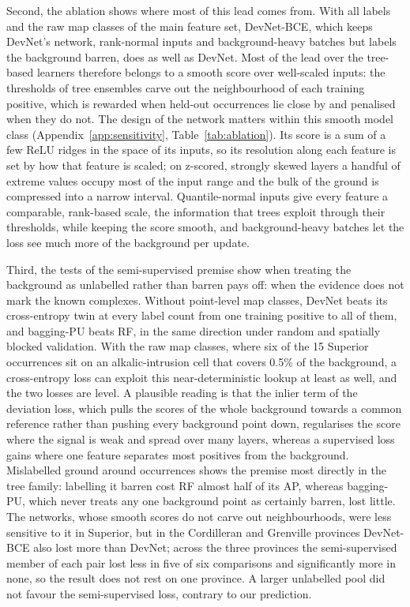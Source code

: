 \documentclass[pdflatex,sn-apa]{sn-jnl}
\begin{document}
Second, the ablation shows where most of this lead comes from. With all labels and the raw map classes of the main feature set, DevNet-BCE, which keeps DevNet's network, rank-normal inputs and background-heavy batches but labels the background barren, does as well as DevNet. Most of the lead over the tree-based learners therefore belongs to a smooth score over well-scaled inputs: the thresholds of tree ensembles carve out the neighbourhood of each training positive, which is rewarded when held-out occurrences lie close by and penalised when they do not. The design of the network matters within this smooth model class (Appendix~\ref{app:sensitivity}, Table~\ref{tab:ablation}). Its score is a sum of a few ReLU ridges in the space of its inputs, so its resolution along each feature is set by how that feature is scaled; on z-scored, strongly skewed layers a handful of extreme values occupy most of the input range and the bulk of the ground is compressed into a narrow interval. Quantile-normal inputs give every feature a comparable, rank-based scale, the information that trees exploit through their thresholds, while keeping the score smooth, and background-heavy batches let the loss see much more of the background per update.

Third, the tests of the semi-supervised premise show when treating the background as unlabelled rather than barren pays off: when the evidence does not mark the known complexes. Without point-level map classes, DevNet beats its cross-entropy twin at every label count from one training positive to all of them, and bagging-PU beats RF, in the same direction under random and spatially blocked validation. With the raw map classes, where six of the 15 Superior occurrences sit on an alkalic-intrusion cell that covers 0.5\% of the background, a cross-entropy loss can exploit this near-deterministic lookup at least as well, and the two losses are level. A plausible reading is that the inlier term of the deviation loss, which pulls the scores of the whole background towards a common reference rather than pushing every background point down, regularises the score where the signal is weak and spread over many layers, whereas a supervised loss gains where one feature separates most positives from the background. Mislabelled ground around occurrences shows the premise most directly in the tree family: labelling it barren cost RF almost half of its AP, whereas bagging-PU, which never treats any one background point as certainly barren, lost little. The networks, whose smooth scores do not carve out neighbourhoods, were less sensitive to it in Superior, but in the Cordilleran and Grenville provinces DevNet-BCE also lost more than DevNet; across the three provinces the semi-supervised member of each pair lost less in five of six comparisons and significantly more in none, so the result does not rest on one province. A larger unlabelled pool did not favour the semi-supervised loss, contrary to our prediction.
\end{document}
